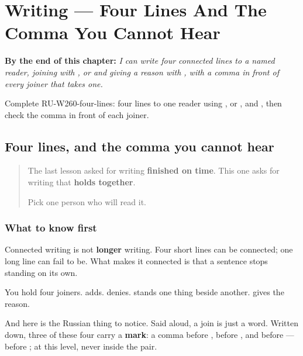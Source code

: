 
\chapter{Writing --- Four Lines And The Comma You Cannot Hear}
\label{ch:ru-four-lines}

\begin{chapteropening}
\textbf{By the end of this chapter:} \emph{I can write four connected lines to a named reader, joining with ,  or  and giving a reason with  , with a comma in front of every joiner that takes one.}

Complete RU-W260-four-lines: four lines to one reader using ,  or , and  , then check the comma in front of each joiner.
\end{chapteropening}

\section[\texorpdfstring{\ru{потому} \ru{что} (potomú shto)}{потому что (potomú shto)}]{Four lines, and the comma you cannot hear}

\label{lesson:RU-W260-four-lines}



\begin{quote}
The last lesson asked for writing \textbf{finished on time}. This one asks for writing that \textbf{holds together}.

Pick one person who will read it.
\end{quote}

\subsection*{What to know first}
Connected writing is not \textbf{longer} writing. Four short lines can be connected; one long line can fail to be. What makes it connected is that a sentence stops standing on its own.

You hold four joiners. \textbf{} adds. \textbf{} denies. \textbf{} stands one thing beside another. \textbf{ } gives the reason.

And here is the Russian thing to notice. Said aloud, a join is just a word. Written down, three of these four carry a \textbf{mark}: a comma before \textbf{}, before \textbf{}, and before \textbf{ } — before \textbf{}; at this level, never inside the pair.

